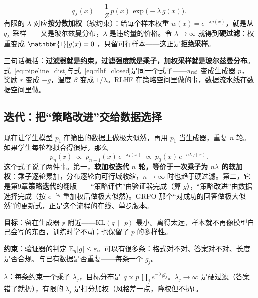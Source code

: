 \begin{keyformula}[title=数据流水线的目标分布]
\begin{equation}
    q_\lambda(x) = \frac{1}{Z}\,p(x)\,\exp\big(-\lambda\,g(x)\big).
    \label{eq:pipeline_dist}
\end{equation}
有限的 $\lambda$ 对应\textbf{按分数加权}（软约束）：给每个样本权重 $w(x) = e^{-\lambda g(x)}$，就是从 $q_\lambda$ 采样——又是玻尔兹曼分布，$\lambda$ 是违约量的价格。令 $\lambda \to \infty$ 就得到\textbf{硬过滤}：权重变成 $\mathbbm{1}[g(x) = 0]$，只留可行样本——这正是\textbf{拒绝采样}。
\end{keyformula}

三句话概括：\textbf{过滤器就是约束，过滤强度就是乘子，加权采样就是玻尔兹曼分布}。式~\eqref{eq:pipeline_dist}与式~\eqref{eq:rlhf_closed}是同一个式子——$\pi_{\rm ref}$ 变成生成器 $p$，奖励 $r$ 变成 $-g$，温度 $\beta$ 变成 $1/\lambda$。RLHF 在策略空间里做的事，数据流水线在数据空间里做。

\subsection{迭代：把“策略改进”交给数据选择}

现在让学生模型 $p_1$ 在筛出的数据上做极大似然，再用 $p_1$ 当生成器，重复 $n$ 轮。如果学生每轮都拟合得很好，那么
\begin{equation}
    p_n(x) \;\propto\; p_{n-1}(x)\,e^{-\lambda g(x)} \;\propto\; p_0(x)\,e^{-n\lambda\,g(x)}.
    \label{eq:pipeline_iter}
\end{equation}
这个式子说了两件事。第一，\textbf{软加权迭代 $n$ 轮，等价于一次乘子为 $n\lambda$ 的软加权}：乘子逐轮累加，分布逐轮向可行域收缩，$n \to \infty$ 时也趋于硬过滤。第二，它是第9章\textbf{策略迭代}的翻版——“策略评估”由验证器完成（算 $g$），“策略改进”由数据选择完成（按 $e^{-\lambda g}$ 重加权后做极大似然）。GRPO 那个“对成功的回答做极大似然”的更新式，正是这个流程的在线、单步版本。

\begin{keyidea}
\textbf{目标}：留在生成器 $p$ 附近——$\mathrm{KL}(q\,\|\,p)$ 最小。离得太远，样本就不再像模型自己会写的东西，训练时学不动；也保留了 $p$ 的多样性。

\textbf{约束}：验证器的判定 $\mathbb{E}_q[g] \le \varepsilon$。可以有很多条：格式对不对、答案对不对、长度是否合规、与已有数据是否重复——每条一个 $g_j$。

\textbf{$\lambda$}：每条约束一个乘子 $\lambda_j$，目标分布是 $q \propto p\,\prod_j e^{-\lambda_j g_j}$。$\lambda_j \to \infty$ 是硬过滤（答案错了就扔），有限的 $\lambda_j$ 是打分加权（风格差一点，降权但不扔）。
\end{keyidea}

